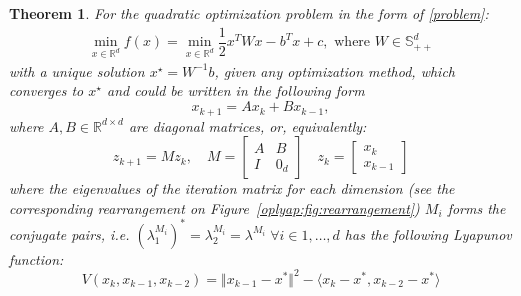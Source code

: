 \documentclass[a4paper,11pt]{article}
\newtheorem{theorem}{Theorem}[section]
\begin{document}
\begin{theorem}
 \label{oplyap:th:main_theorem}
 For the quadratic optimization problem in the form of \eqref{problem}:
 \begin{align}
 \label{oplyap:eq:full_problem}
 \min\limits_{x \in \mathbb{R}^d} f(x) = \min\limits_{x \in \mathbb{R}^d} \dfrac{1}{2} x^T W x - b^T x + c, \text{ where }W \in \mathbb{S}^d_{++}
 \end{align}
 with a unique solution $x^\star = W^{-1}b$, given any optimization method, which converges to $x^\star$ and could be written in the following form
 \[
 x_{k+1} = A x_k + B x_{k-1},
 \]
 where $A, B \in \mathbb{R}^{d \times d}$ are diagonal matrices, or, equivalently:
 \[
 z_{k+1} = M z_k, \quad M = \begin{bmatrix} 
 A & B \\
 I & 0_{d}
 \end{bmatrix} \quad 
 z_k = \begin{bmatrix} 
 x_{k} \\
 x_{k-1}
 \end{bmatrix}
 \]
 where the eigenvalues of the iteration matrix for each dimension (see the corresponding rearrangement on Figure~\ref{oplyap:fig:rearrangement}) $M_i$ forms the conjugate pairs, i.e. $(\lambda_1^{M_i})^* = \lambda_2^{M_i} = \lambda^{M_i} \; \forall i \in 1,\ldots, d$ has the following Lyapunov function:
 \begin{equation}
 \label{oplyap:eq:lyapunov_function}
 V(x_k, x_{k-1}, x_{k-2}) = \Vert x_{k-1} - x^*\Vert ^2 - \langle x_k - x^*, x_{k-2} - x^* \rangle
 \end{equation}
\end{theorem}
\end{document}
